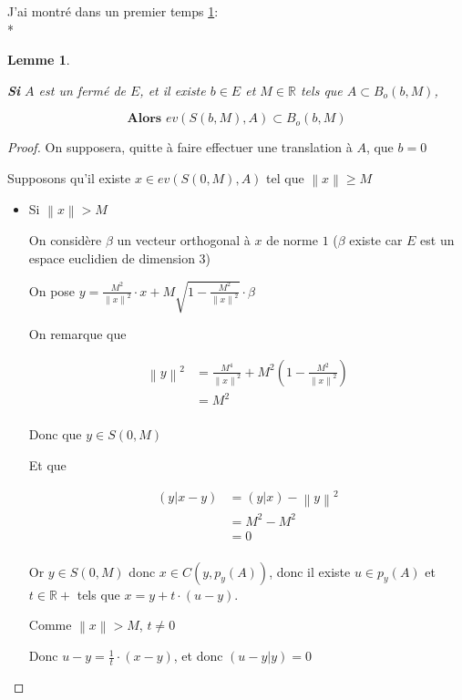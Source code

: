 \documentclass[a4paper]{article}
\newcommand{\norm}[1]{\left\lVert#1\right\rVert}
\newtheorem{lem}{Lemme}
\begin{document}
    J'ai montré dans un premier temps \ref{lem1}:\\*
    \begin{lem}\label{lem1}

    \textbf{Si} $A$ est un fermé de $E$, et il existe $b \in E$ et $M \in \mathbb{R}$ tels que $A \subset B_{o}(b, M)$,

    \[\textbf{Alors } ev(S(b,M), A) \subset B_{o}(b, M)\]

    \end{lem}

    \begin{proof}

    On supposera, quitte à faire effectuer une translation à $A$, que $b = 0$

    Supposons qu'il existe $x \in ev(S(0,M), A)$ tel que $\norm{x} \geqslant M$

    \begin{itemize}
    \item Si $\norm{x} > M$ 

    On considère $\beta$ un vecteur orthogonal à $x$ de norme $1$ ($\beta$ existe car $E$ est un espace euclidien de dimension $3$)

    On pose $y = \frac{M^{2}}{\norm{x}^{2}} \cdot x + M \sqrt{1 - \frac{M^{2}}{\norm{x}^{2}}} \cdot \beta$

    On remarque que 

    \begin{align*}
    \norm{y}^{2} &= \frac{M^{4}}{\norm{x}^{2}} + M^{2} (1 -\frac{M^{2}}{\norm{x}^{2}}) \\
                 &= M^{2}\\
    \end{align*}

    Donc que $y \in S(0, M)$

    Et que

    \begin{align*}
    (y|x - y) &= (y|x) - \norm{y}^{2}\\
              &= M^{2} - M^{2}\\
              &= 0\\
    \end{align*}

    Or $y \in S(0, M)$ donc $x \in C(y, p_{y}(A))$, donc il existe $u\in p_{y}(A)$ et $t\in \mathbb{R}+$ tels que $x = y + t \cdot (u - y)$.

    Comme $\norm{x} > M$, $t\neq 0$

    Donc $u - y = \frac{1}{t} \cdot (x - y)$, et donc $(u - y|y) = 0$


\end{itemize}
\end{proof}
\end{document}
